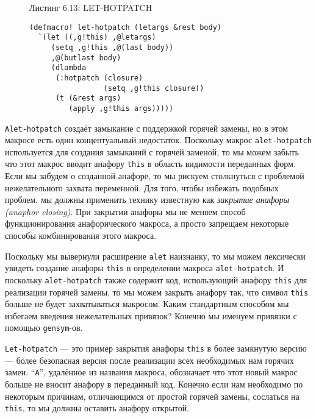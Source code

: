 \begin{figure}Листинг 6.13: LET-HOTPATCH\label{listing_6.13}
\listbegin
\begin{verbatim}
(defmacro! let-hotpatch (letargs &rest body)
  `(let ((,g!this) ,@letargs)
     (setq ,g!this ,@(last body))
     ,@(butlast body)
     (dlambda
      (:hotpatch (closure)
                 (setq ,g!this closure))
      (t (&rest args)
         (apply ,g!this args)))))
\end{verbatim}
\listend
\end{figure}

\verb"Alet-hotpatch" создаёт замыкание с поддержкой горячей замены, но в этом макросе есть один концептуальный недостаток. Поскольку макрос \verb"alet-hotpatch" используется для создания замыканий с горячей заменой, то мы можем забыть что этот макрос вводит анафору \verb"this" в область видимости переданных форм. Если мы забудем о созданной анафоре, то мы рискуем столкнуться с проблемой нежелательного захвата переменной. Для того, чтобы избежать подобных проблем, мы должны применить технику известную как \emph{закрытие анафоры (anaphor closing)}. При закрытии анафоры мы не меняем способ функционирования анафорического макроса, а просто запрещаем некоторые способы комбинирования этого макроса.

Поскольку мы вывернули расширение \verb"alet" наизнанку, то мы можем лексически увидеть создание анафоры \verb"this" в определении макроса \verb"alet-hotpatch". И поскольку \verb"alet-hotpatch" также содержит код, использующий анафору \verb"this" для реализации горячей замены, то мы можем закрыть анафору так, что символ \verb"this" больше не будет захватываться макросом. Каким стандартным способом мы избегаем введения нежелательных привязок? Конечно мы именуем привязки с помощью \verb"gensym"-ов.

\verb"Let-hotpatch" --- это пример закрытия анафоры \verb"this" в более замкнутую версию --- более безопасная версия после реализации всех необходимых нам горячих замен. ``\verb"A"'', удалённое из названия макроса, обозначает что этот новый макрос больше не вносит анафору в переданный код. Конечно если нам необходимо по некоторым причинам, отличающимся от простой горячей замены, сослаться на \verb"this", то мы должны оставить анафору открытой.

